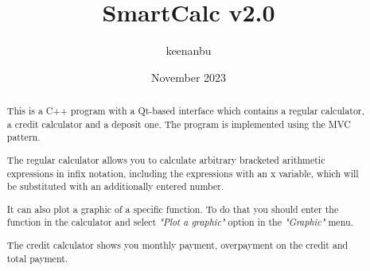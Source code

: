\documentclass[a4paper, 12pt]{article}
\title{SmartCalc v2.0}
\author{keenanbu}
\date{November 2023}
\begin{document}
\maketitle
\newpage
\begin{abstract}
This is a C++ program with a Qt-based interface which contains a regular calculator, a credit calculator and a deposit one. The program is implemented using the MVC pattern.

The regular calculator allows you to calculate arbitrary bracketed arithmetic expressions in infix notation, including the expressions with an x variable, which will be substituted with an additionally entered number.

It can also plot a graphic of a specific function. To do that you should enter the function in the calculator and select \textit{"Plot a graphic"} option in the \textit{"Graphic"} menu.

\newpage

{\parskip 10mm The credit calculator shows you monthly payment, overpayment on the credit and total payment.}

\newpage


\end{abstract}
\end{document}
